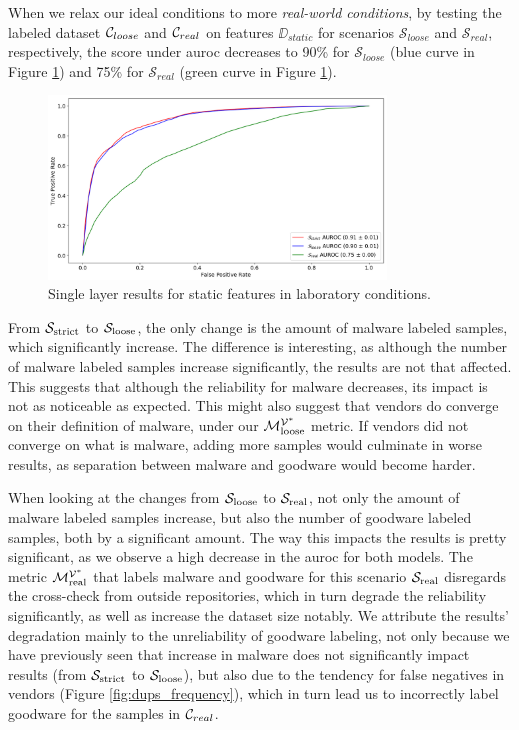 When we relax our ideal conditions to more \textit{real-world conditions}, by testing the labeled dataset $\mathcal{C}_{loose}$ and $\mathcal{C}_{real}$ on features $\DD_{static}$ for scenarios $\mathcal{S}_{loose}$ and $\mathcal{S}_{real}$, respectively, the score under \gls{auroc} decreases to 90\% for $\mathcal{S}_{loose}$ (blue curve in Figure \ref{fig:xval_results}) and 75\% for $\mathcal{S}_{real}$ (green curve in Figure \ref{fig:xval_results}).

\begin{figure}[!htb]
	\centering
	\includegraphics[width=0.8\textwidth]{Figures/xval_results.png}
	\caption[Single layer results for static features in laboratory conditions.]{Single layer results for static features in laboratory conditions.}
	\label{fig:xval_results}
\end{figure}

From $\mathcal{S}_{\mathrm{strict}}$ to $\mathcal{S}_{\mathrm{loose}}$, the only change is the amount of malware labeled samples, which significantly increase.
The difference is interesting, as although the number of malware labeled samples increase significantly, the results are not that affected.
This suggests that although the reliability for malware decreases, its impact is not as noticeable as expected.
This might also suggest that vendors do converge on their definition of malware, under our $\mathcal{M}_{\mathrm{loose}}^{\mathcal{V}^*}$ metric.
If vendors did not converge on what is malware, adding more samples would culminate in worse results, as separation between malware and goodware would become harder.

When looking at the changes from $\mathcal{S}_{\mathrm{loose}}$ to $\mathcal{S}_{\mathrm{real}}$, not only the amount of malware labeled samples increase, but also the number of goodware labeled samples, both by a significant amount. 
The way this impacts the results is pretty significant, as we observe a high decrease in the \gls{auroc} for both models.
The metric $\mathcal{M}_{\mathrm{real}}^{\mathcal{V}^*}$ that labels malware and goodware for this scenario $\mathcal{S}_{\mathrm{real}}$ disregards the cross-check from outside repositories, which in turn degrade the reliability significantly, as well as increase the dataset size notably.
We attribute the results' degradation mainly to the unreliability of goodware labeling, not only because we have previously seen that increase in malware does not significantly impact results (from $\mathcal{S}_{\mathrm{strict}}$ to $\mathcal{S}_{\mathrm{loose}}$), but also due to the tendency for false negatives in vendors (Figure \ref{fig:dups_frequency}), which in turn lead us to incorrectly label goodware for the samples in $\mathcal{C}_{real}$.

